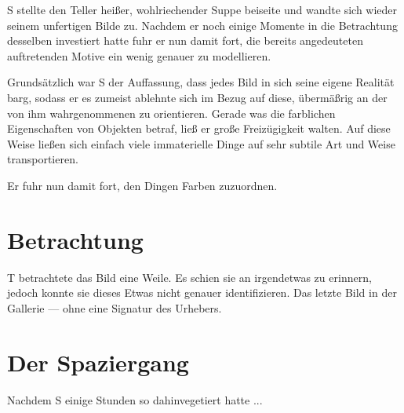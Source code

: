 \documentclass{article}
\begin{document}
S stellte den Teller heißer, wohlriechender Suppe beiseite und wandte sich wieder seinem unfertigen Bilde zu. Nachdem er noch einige Momente in die Betrachtung desselben investiert hatte fuhr er nun damit fort, die bereits angedeuteten auftretenden Motive ein wenig genauer zu modellieren.

Grundsätzlich war S der Auffassung, dass jedes Bild in sich seine eigene Realität barg, sodass er es zumeist ablehnte sich im Bezug auf diese, übermäßrig an der von ihm wahrgenommenen zu orientieren. Gerade was die farblichen Eigenschaften von Objekten betraf, ließ er große Freizügigkeit walten. Auf diese Weise ließen sich einfach viele immaterielle Dinge auf sehr subtile Art und Weise transportieren.

Er fuhr nun damit fort, den Dingen Farben zuzuordnen. 

\chapter{Betrachtung}

T betrachtete das Bild eine Weile. Es schien sie an irgendetwas zu erinnern, jedoch konnte sie dieses Etwas nicht genauer identifizieren.
Das letzte Bild in der Gallerie --- ohne eine Signatur des Urhebers.


\chapter{Der Spaziergang}

Nachdem S einige Stunden so dahinvegetiert hatte ...
\end{document}
